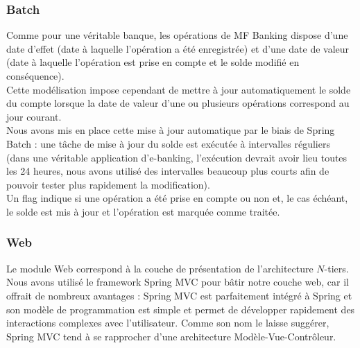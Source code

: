 \subsubsection*{Batch}

Comme pour une véritable banque, les opérations de MF Banking dispose d'une date d'effet (date à laquelle l'opération a été enregistrée) et d'une date de valeur (date à laquelle l'opération est prise en compte et le solde modifié en conséquence).\\

Cette modélisation impose cependant de mettre à jour automatiquement le solde du compte lorsque la date de valeur d'une ou plusieurs opérations correspond au jour courant.\\
Nous avons mis en place cette mise à jour automatique par le biais de Spring Batch : une tâche de mise à jour du solde est exécutée à intervalles réguliers (dans une véritable application d'e-banking, l'exécution devrait avoir lieu toutes les 24 heures, nous avons utilisé des intervalles beaucoup plus courts afin de pouvoir tester plus rapidement la modification).\\
Un flag indique si une opération a été prise en compte ou non et, le cas échéant, le solde est mis à jour et l'opération est marquée comme traitée.

\subsubsection*{Web}

Le module Web correspond à la couche de présentation de l'architecture $N$-tiers.\\
Nous avons utilisé le framework Spring MVC pour bâtir notre couche web, car il offrait de nombreux avantages : Spring MVC est parfaitement intégré à Spring et son modèle de programmation est simple et permet de développer rapidement des interactions complexes avec l'utilisateur. Comme son nom le laisse suggérer, Spring MVC tend à se rapprocher d'une architecture Modèle-Vue-Contrôleur.\\

